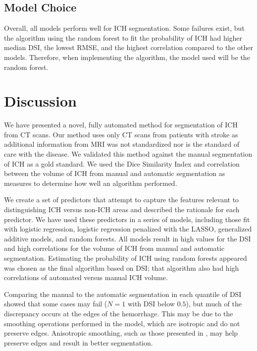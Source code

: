 \subsection{Model Choice}
Overall, all models perform well for ICH segmentation.  Some failures exist, but the algorithm using the random forest to fit the probability of ICH had higher median DSI, the lowest RMSE, and the highest correlation compared to the other models.  Therefore, when implementing the algorithm, the model used will be the random forest.



\section{Discussion}
We have presented a novel, fully automated method for segmentation of ICH from CT scans. Our method uses only CT scans from patients with stroke as additional information from MRI was not standardized nor is the standard of care with the disease. We validated this method against the manual segmentation of ICH as a gold standard.  We used the Dice Similarity Index and correlation between the volume of ICH from manual and automatic segmentation as measures to determine how well an algorithm performed.  

We create a set of predictors that attempt to capture the features relevant to distinguishing ICH versus non-ICH areas and described the rationale for each predictor.  We have used these predictors in a series of models, including those fit with logistic regression, logistic regression penalized with the LASSO, generalized additive models, and random forests.  All models result in high values for the DSI and high correlations for the volume of ICH from manual and automatic segmentation. Estimating the probability of ICH using random forests appeared was chosen as the final algorithm based on DSI; that algorithm also had high correlations of automated versus manual ICH volume.  

Comparing the manual to the automatic segmentation in each quantile of DSI showed that some cases may fail ($N = 1$ with DSI below $0.5$), but much of the discrepancy occurs at the edges of the hemorrhage.  This may be due to the smoothing operations performed in the model, which are isotropic and do not preserve edges.  Anisotropic smoothing, such as those presented in \citet{perona1994anisotropic}, may help preserve edges and result in better segmentation.  



